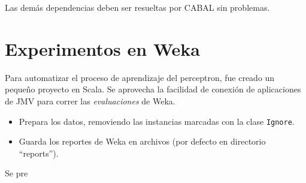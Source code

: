 \documentclass{article}
\begin{document}
Las demás dependencias deben ser resueltas por CABAL sin problemas.

\section{Experimentos en Weka}

Para automatizar el proceso de aprendizaje del perceptron, fue creado un pequeño proyecto en Scala. Se aprovecha la facilidad de conexión de aplicaciones de JMV para correr las \emph{evaluaciones} de Weka.

\begin{itemize}
\item Prepara los datos, removiendo las instancias marcadas con la clase 
    \verb|Ignore|.
\item Guarda los reportes de Weka en archivos (por defecto en directorio ``reports'').
\end{itemize}

\medskip
Se pre
\end{document}
